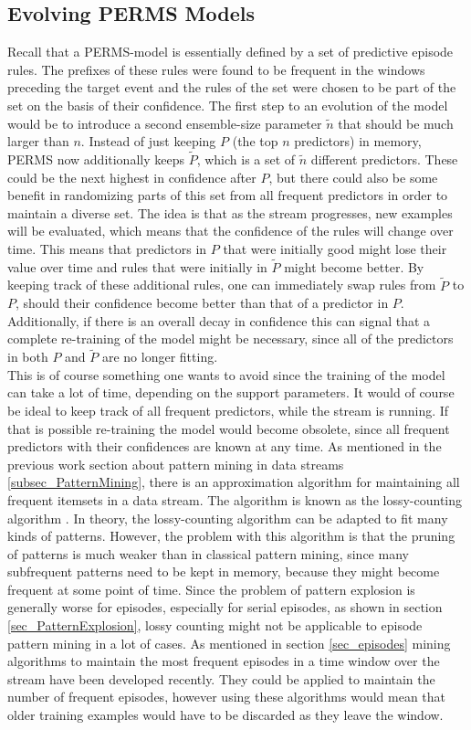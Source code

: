\subsection{Evolving PERMS Models}
\label{subsec_evolvingPerms}
Recall that a PERMS-model is essentially defined by a set of predictive episode rules. The prefixes of these rules were found to be frequent in the windows preceding the target event and the rules of the set were chosen to be part of the set on the basis of their confidence. The first step to an evolution of the model would be to introduce a second ensemble-size parameter $\tilde{n}$ that should be much larger than $n$. Instead of just keeping $P$ (the top $n$ predictors) in memory, PERMS now additionally keeps $\tilde{P}$, which is a set of $\tilde{n}$ different predictors. These could be the next highest in confidence after $P$, but there could also be some benefit in randomizing parts of this set from all frequent predictors in order to maintain a diverse set. The idea is that as the stream progresses, new examples will be evaluated, which means that the confidence of the rules will change over time. This means that predictors in $P$ that were initially good might lose their value over time and rules that were initially in $\tilde{P}$ might become better. By keeping track of these additional rules, one can immediately swap rules from $\tilde{P}$ to $P$, should their confidence become better than that of a predictor in $P$. Additionally, if there is an overall decay in confidence this can signal that a complete re-training of the model might be necessary, since all of the predictors in both $P$ and $\tilde{P}$ are no longer fitting. \\
This is of course something one wants to avoid since the training of the model can take a lot of time, depending on the support parameters. It would of course be ideal to keep track of all frequent predictors, while the stream is running. If that is possible re-training the model would become obsolete, since all frequent predictors with their confidences are known at any time. As mentioned in the previous work section about pattern mining in data streams \ref{subsec_PatternMining}, there is an approximation algorithm for maintaining all frequent itemsets in a data stream. The algorithm is known as the lossy-counting algorithm \cite{manku2002approximate}. In theory, the lossy-counting algorithm can be adapted to fit many kinds of patterns.  However, the problem with this algorithm is that the pruning of patterns is much weaker than in classical pattern mining, since many subfrequent patterns need to be kept in memory, because they might become frequent at some point of time. Since the problem of pattern explosion is generally worse for episodes, especially for serial episodes, as shown in section \ref{sec_PatternExplosion}, lossy counting might not be applicable to episode pattern mining in a lot of cases. As mentioned in section \ref{sec_episodes} mining algorithms to maintain the most frequent episodes in a time window over the stream have been developed recently. They could be applied to maintain the number of frequent episodes, however using these algorithms would mean that older training examples would have to be discarded as they leave the window.

